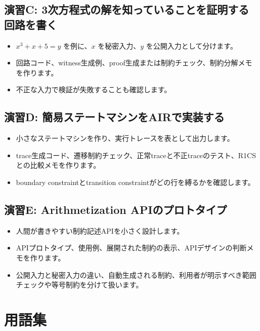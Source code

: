 \documentclass[a4paper,11pt]{ltjsarticle}
\begin{document}
\subsection{演習C: 3次方程式の解を知っていることを証明する回路を書く}

\begin{itemize}
  \item \(x^3+x+5=y\) を例に、\(x\) を秘密入力、\(y\) を公開入力として分けます。
  \item 回路コード、witness生成例、proof生成または制約チェック、制約分解メモを作ります。
  \item 不正な入力で検証が失敗することも確認します。
\end{itemize}

\subsection{演習D: 簡易ステートマシンをAIRで実装する}

\begin{itemize}
  \item 小さなステートマシンを作り、実行トレースを表として出力します。
  \item trace生成コード、遷移制約チェック、正常traceと不正traceのテスト、R1CSとの比較メモを作ります。
  \item boundary constraintとtransition constraintがどの行を縛るかを確認します。
\end{itemize}

\subsection{演習E: Arithmetization APIのプロトタイプ}

\begin{itemize}
  \item 人間が書きやすい制約記述APIを小さく設計します。
  \item APIプロトタイプ、使用例、展開された制約の表示、APIデザインの判断メモを作ります。
  \item 公開入力と秘密入力の違い、自動生成される制約、利用者が明示すべき範囲チェックや等号制約を分けて扱います。
\end{itemize}

\section{用語集}
\end{document}
